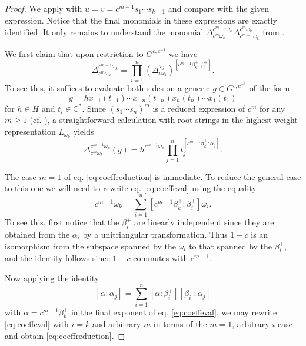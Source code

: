 \documentclass[11pt]{amsart}
\newcommand{\CC}{\mathbb{C}}
\numberwithin{equation}{section}
\begin{document}
  \begin{proof}
    We apply  with $u = v = c^{m-1}s_1 \cdots s_{k-1}$ and compare with the given expression.  Notice that the final monomials in these expressions are exactly identified.  It only remains to understand the monomial $\Delta_{c^m \omega_k}^{c^{m-1} \omega_k}\Delta_{c^{m-1} \omega_k}^{c^m \omega_k}$ from .

    We first claim that upon restriction to $G^{c,c^{-1}}$ we have
    \begin{equation}\label{eq:coeffreduction}
      \Delta_{c^m \omega_k}^{c^{m-1} \omega_k} = 
      \prod_{i=1}^n (\Delta_{c \omega_i}^{\omega_i})^{[c^{m-1}\beta_k^+:\beta_i^+]}.
    \end{equation}
    To see this, it suffices to evaluate both sides on a generic $g \in G^{c,c^{-1}}$ of the form
    \[
      g = hx_{-1}(t_{-1}) \cdots x_{-n}(t_{-n}) x_{n}(t_{n}) \cdots x_{1}(t_{1})
    \]
    for $h \in H$ and $t_i \in \CC^*$.  Since $(s_1 \cdots s_n)^m$ is a reduced expression of $c^m$ for any $m \geq 1$ (cf. \cite{Spe09}), a straightforward calculation with root strings in the highest weight representation $L_{\omega_k}$ yields
    \begin{equation}\label{eq:coeffeval}
      \Delta_{c^m \omega_k}^{c^{m-1}\omega_k}(g) = h^{c^{m-1}\omega_k} \prod_{j=1}^n t_j^{[c^{m-1}\beta_k^+:\alpha_j]}.
    \end{equation}
    
    The case $m=1$ of eq. \eqref{eq:coeffreduction} is immediate.  To reduce the general case to this one we will need to rewrite eq. \eqref{eq:coeffeval} using the equality
    \[
      c^{m-1} \omega_k = \sum_{i=1}^n [c^{m-1}\beta_k^+:\beta_i^+]\omega_i.
    \]
    To see this, first notice that the $\beta_i^+$ are linearly independent since they are obtained from the $\alpha_i$ by a unitriangular transformation.  Thus $1-c$ is an isomorphism from the subspace spanned by the $\omega_i$ to that spanned by the $\beta_i^+$, and the identity follows since $1-c$ commutes with $c^{m-1}$.  

    Now applying the identity
    \[
      [\alpha:\alpha_j] = \sum_{i=1}^n [\alpha:\beta_i^+][\beta_i^+:\alpha_j]
    \]
    with $\alpha=c^{m-1}\beta_k^+$ in the final exponent of eq. \eqref{eq:coeffeval},
    we may rewrite \cref{eq:coeffeval} with $i = k$ and arbitrary $m$ in terms of the $m = 1$, arbitrary $i$ case and obtain \cref{eq:coeffreduction}.


\end{proof}
\end{document}
